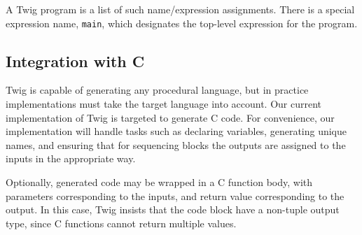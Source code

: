 A Twig program is a list of such name/expression assignments. There is a special expression name, \texttt{main}, which designates the top-level expression for the program.

\subsection{Integration with C}
\label{twig:concrete-code-gen}

Twig is capable of generating any procedural language, but in practice implementations must take the target language into account. Our current implementation of Twig is targeted to generate C code. For convenience, our implementation will handle tasks such as declaring variables, generating unique names, and ensuring that for sequencing blocks the outputs are assigned to the inputs in the appropriate way.

Optionally, generated code may be wrapped in a C function body, with parameters corresponding to the inputs, and return value corresponding to the output. In this case, Twig insists that the code block have a non-tuple output type, since C functions cannot return multiple values.
